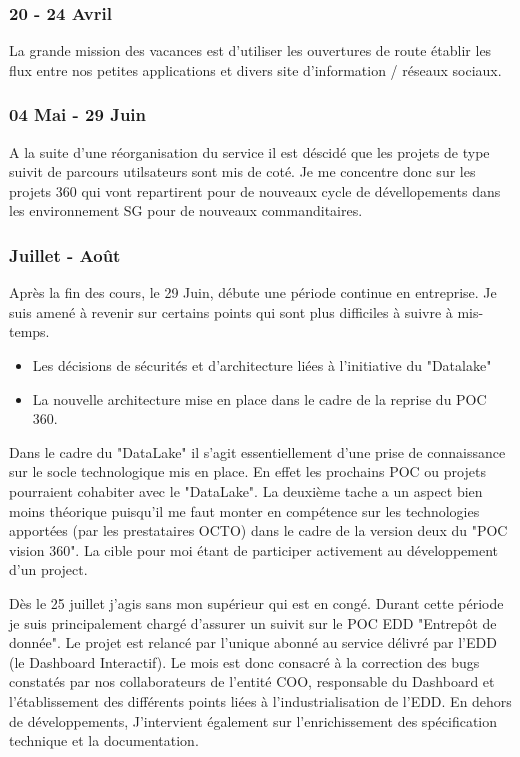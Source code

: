 \subsubsection*{20 - 24 Avril}
La grande mission des vacances est d'utiliser les ouvertures de route établir les flux entre nos petites applications et divers site d'information / réseaux sociaux.

\subsubsection*{04 Mai - 29 Juin}
A la suite d'une réorganisation du service il est déscidé que les projets de type suivit de parcours utilsateurs sont mis de coté. Je me concentre donc sur les projets 360 qui vont repartirent pour de nouveaux cycle de dévellopements dans les environnement SG pour de nouveaux commanditaires.
 

\subsubsection*{Juillet - Août}
\par
	Après la fin des cours, le 29 Juin, débute une période continue en entreprise.
Je suis amené à revenir sur certains points qui sont plus difficiles à suivre à mis-temps.
\begin{itemize}
\item Les décisions de sécurités et d’architecture liées à l’initiative du "Datalake"
\item La nouvelle architecture mise en place dans le cadre de la reprise du POC 360.
\end{itemize}
Dans le cadre du "DataLake" il s’agit essentiellement d’une prise de connaissance sur le socle technologique mis en place. En effet les prochains POC ou projets pourraient cohabiter avec le "DataLake". La deuxième tache a un aspect bien moins théorique puisqu’il me faut monter en compétence sur les technologies apportées (par les prestataires OCTO) dans le cadre de la version deux du "POC vision 360".  La cible pour moi étant de participer activement au développement d’un project.
\par
	Dès le 25 juillet j’agis sans mon supérieur qui est en congé. Durant cette période je
suis principalement chargé d’assurer un suivit sur le POC EDD "Entrepôt de
donnée". Le projet est relancé par l’unique abonné au service délivré par l’EDD 
(le Dashboard Interactif). Le mois est donc consacré à la correction des bugs constatés 
par nos collaborateurs de l’entité COO, responsable du Dashboard et l’établissement
des différents points liées à l’industrialisation de l’EDD. En dehors de développements,   
J’intervient également sur l’enrichissement des spécification technique et la
documentation. 

